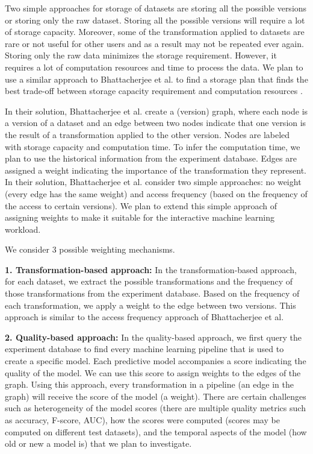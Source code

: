 \documentclass{sig-alternate-05-2015}
\begin{document}
Two simple approaches for storage of datasets are storing all the possible versions or storing only the raw dataset.
Storing all the possible versions will require a lot of storage capacity.
Moreover, some of the transformation applied to datasets are rare or not useful for other users and as a result may not be repeated ever again.
Storing only the raw data minimizes the storage requirement.
However, it requires a lot of computation resources and time to process the data.
We plan to use a similar approach to Bhattacherjee et al. to find a storage plan that finds the best trade-off between storage capacity requirement and computation resources \cite{bhattacherjee2015principles}.

In their solution, Bhattacherjee et al. create a (version) graph, where each node is a version of a dataset and an edge between two nodes indicate that one version is the result of a transformation applied to the other version.
Nodes are labeled with storage capacity and computation time.
To infer the computation time, we plan to use the historical information from the experiment database.
Edges are assigned a weight indicating the importance of the transformation they represent. 
In their solution, Bhattacherjee et al. consider two simple approaches: no weight (every edge has the same weight) and access frequency (based on the frequency of the access to certain versions).
We plan to extend this simple approach of assigning weights to make it suitable for the interactive machine learning workload.

We consider 3 possible weighting mechanisms.

\textbf{1. Transformation-based approach:}
In the transformation-based approach, for each dataset, we extract the possible transformations and the frequency of those transformations from the experiment database. 
Based on the frequency of each transformation, we apply a weight to the edge between two versions.
This approach is similar to the access frequency approach of Bhattacherjee et al.

\textbf{2. Quality-based approach:}
In the quality-based approach, we first query the experiment database to find every machine learning pipeline that is used to create a specific model.
Each predictive model accompanies a score indicating the quality of the model.
We can use this score to assign weights to the edges of the graph.
Using this approach, every transformation in a pipeline (an edge in the graph) will receive the score of the model (a weight).
There are certain challenges such as heterogeneity of the model scores (there are multiple quality metrics such as accuracy, F-score, AUC), how the scores were computed (scores may be computed on different test datasets), and the temporal aspects of the model (how old or new a model is) that we plan to investigate.
\end{document}
